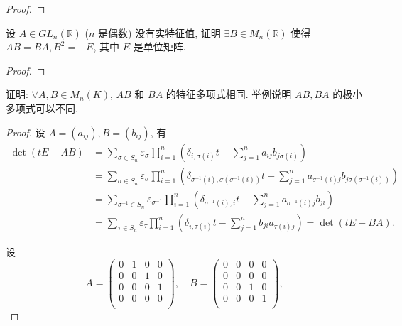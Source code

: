 \documentclass[color=black,device=normal,lang=cn,mode=geye]{elegantnote}
\begin{document}
\begin{proof}
\end{proof}
\begin{exercise}%
    设 $A\in GL_n(\mathbb{R})$ ($n$ 是偶数) 没有实特征值, 证明 $\exists B\in M_n(\mathbb{R})$ 使得 $AB=BA,B^2=-E$, 其中 $E$ 是单位矩阵.
\end{exercise}
\begin{proof}
\end{proof}
\begin{exercise}[按照 2.3.17 修改]%
    证明: $\forall A,B\in M_n(K)$, $AB$ 和 $BA$ 的特征多项式相同. 举例说明 $AB,BA$ 的极小多项式可以不同.
\end{exercise}
\begin{proof}
    设 $A=(a_{ij}),B=(b_{ij})$, 有
    \begin{align*}
        \det(tE-AB) & =\sum\limits_{\sigma\in S_n}\varepsilon_\sigma\prod\limits_{i=1}^n\left(\delta_{i,\sigma(i)}t-\sum\limits_{j=1}^na_{ij}b_{j\sigma(i)}\right) \\
        & =\sum\limits_{\sigma\in S_n}\varepsilon_\sigma\prod\limits_{i=1}^n\left(\delta_{\sigma^{-1}(i),\sigma(\sigma^{-1}(i))}t-\sum\limits_{j=1}^na_{\sigma^{-1}(i)j}b_{j\sigma(\sigma^{-1}(i))}\right) \\
        & =\sum\limits_{\sigma^{-1}\in S_n}\varepsilon_{\sigma^{-1}}\prod\limits_{i=1}^n\left(\delta_{\sigma^{-1}(i),i}t-\sum\limits_{j=1}^na_{\sigma^{-1}(i)j}b_{ji}\right) \\
        & =\sum\limits_{\tau\in S_n}\varepsilon_{\tau}\prod\limits_{i=1}^n\left(\delta_{i,\tau(i)}t-\sum\limits_{j=1}^nb_{ji}a_{\tau(i)j}\right)=\det(tE-BA).
    \end{align*}

    设
    \[A=\begin{pmatrix}
        0 & 1 & 0 & 0 \\
        0 & 0 & 1 & 0 \\
        0 & 0 & 0 & 1 \\
        0 & 0 & 0 & 0 \\
    \end{pmatrix},\quad B=\begin{pmatrix}
        0 & 0 & 0 & 0 \\
        0 & 0 & 0 & 0 \\
        0 & 0 & 1 & 0 \\
        0 & 0 & 0 & 1 \\
    \end{pmatrix},\]


\end{proof}
\end{document}
